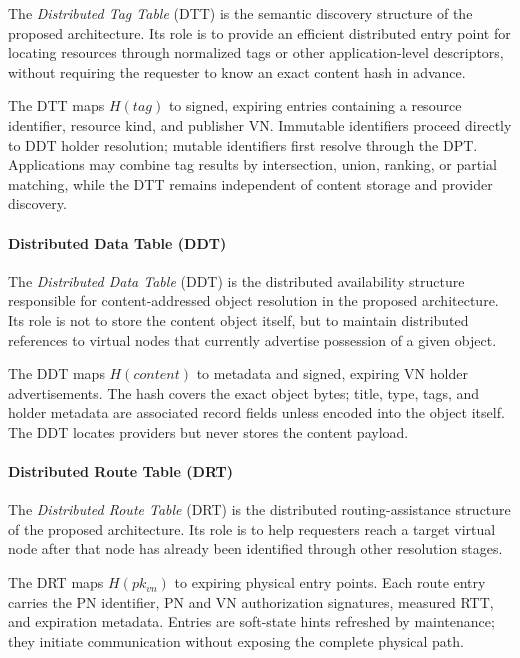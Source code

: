 \documentclass[12pt,a4paper]{article}
\begin{document}
The \textit{Distributed Tag Table} (DTT) is the semantic discovery structure of the proposed architecture. Its role is to provide an efficient distributed entry point for locating resources through normalized tags or other application-level descriptors, without requiring the requester to know an exact content hash in advance.

The DTT maps $H(tag)$ to signed, expiring entries containing a resource identifier, resource kind, and publisher VN. Immutable identifiers proceed directly to DDT holder resolution; mutable identifiers first resolve through the DPT. Applications may combine tag results by intersection, union, ranking, or partial matching, while the DTT remains independent of content storage and provider discovery.

\paragraph{Distributed Data Table (DDT)}

The \textit{Distributed Data Table} (DDT) is the distributed availability structure responsible for content-addressed object resolution in the proposed architecture. Its role is not to store the content object itself, but to maintain distributed references to virtual nodes that currently advertise possession of a given object.

The DDT maps $H(content)$ to metadata and signed, expiring VN holder advertisements. The hash covers the exact object bytes; title, type, tags, and holder metadata are associated record fields unless encoded into the object itself. The DDT locates providers but never stores the content payload.

\paragraph{Distributed Route Table (DRT)}

The \textit{Distributed Route Table} (DRT) is the distributed routing-assistance structure of the proposed architecture. Its role is to help requesters reach a target virtual node after that node has already been identified through other resolution stages.

The DRT maps $H(pk_{vn})$ to expiring physical entry points. Each route entry carries the PN identifier, PN and VN authorization signatures, measured RTT, and expiration metadata. Entries are soft-state hints refreshed by maintenance; they initiate communication without exposing the complete physical path.
\end{document}
